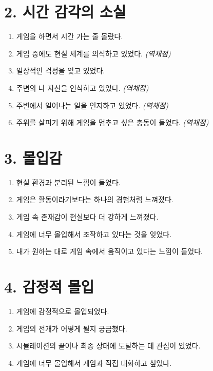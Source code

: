 \documentclass[12pt]{article}
\begin{document}
\section*{2. 시간 감각의 소실}

\begin{enumerate}[resume]
  \item 게임을 하면서 시간 가는 줄 몰랐다.
  \item 게임 중에도 현실 세계를 의식하고 있었다. \textit{(역채점)}
  \item 일상적인 걱정을 잊고 있었다.
  \item 주변의 나 자신을 인식하고 있었다. \textit{(역채점)}
  \item 주변에서 일어나는 일을 인지하고 있었다. \textit{(역채점)}
  \item 주위를 살피기 위해 게임을 멈추고 싶은 충동이 들었다. \textit{(역채점)}
\end{enumerate}

\section*{3. 몰입감}

\begin{enumerate}[resume]
  \item 현실 환경과 분리된 느낌이 들었다.
  \item 게임은 활동이라기보다는 하나의 경험처럼 느껴졌다.
  \item 게임 속 존재감이 현실보다 더 강하게 느껴졌다.
  \item 게임에 너무 몰입해서 조작하고 있다는 것을 잊었다.
  \item 내가 원하는 대로 게임 속에서 움직이고 있다는 느낌이 들었다.
\end{enumerate}

\section*{4. 감정적 몰입}

\begin{enumerate}[resume]
  \item 게임에 감정적으로 몰입되었다.
  \item 게임의 전개가 어떻게 될지 궁금했다.
  \item 시뮬레이션의 끝이나 최종 상태에 도달하는 데 관심이 있었다.
  \item 게임에 너무 몰입해서 게임과 직접 대화하고 싶었다.
\end{enumerate}
\end{document}
